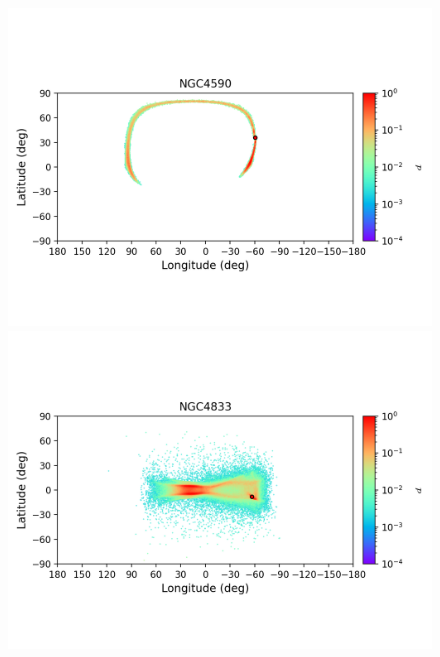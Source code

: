 \begin{figure}
\begin{center}
                \includegraphics[clip=true, trim = 0mm 20mm 0mm 10mm, width=1\columnwidth]{images/error_plots_NGC4590.png}
                \includegraphics[clip=true, trim = 0mm 20mm 0mm 10mm, width=1\columnwidth]{images/error_plots_NGC4833.png}
                

\end{center}
\end{figure}
